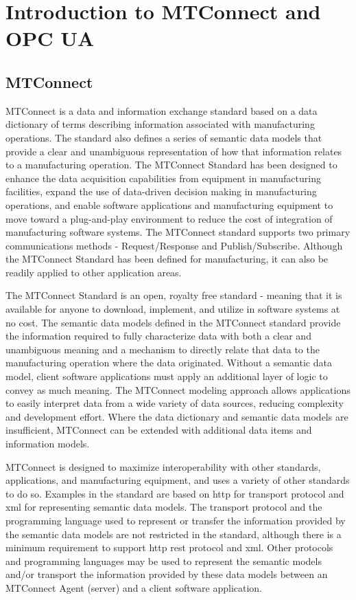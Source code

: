 \section{Introduction to MTConnect and OPC UA}\label{intro}

\subsection{MTConnect}\label{intro-to-mtconnect}
MTConnect is a data and information exchange standard based on a data dictionary of terms describing information associated with manufacturing operations.  The standard also defines a series of semantic data models that provide a clear and unambiguous representation of how that information relates to a manufacturing operation.  The MTConnect Standard has been designed to enhance the data acquisition capabilities from equipment in manufacturing facilities, expand the use of data-driven decision making in manufacturing operations, and enable software applications and manufacturing equipment to move toward a plug-and-play environment to reduce the cost of integration of manufacturing software systems.
The MTConnect standard supports two primary communications methods - Request/Response and Publish/Subscribe.
Although the MTConnect Standard has been defined for manufacturing, it can also be readily applied to other application areas.

The MTConnect Standard is an open, royalty free standard - meaning that it is available for anyone to download, implement, and utilize in software systems at no cost.
The semantic data models defined in the MTConnect standard provide the information required to fully characterize data with both a clear and unambiguous meaning and a mechanism to directly relate that data to the manufacturing operation where the data originated.  Without a semantic data model, client software applications must apply an additional layer of logic to convey as much meaning.  The MTConnect modeling approach allows applications to easily interpret data from a wide variety of data sources, reducing complexity and development effort.
Where the data dictionary and semantic data models are insufficient, MTConnect can be extended with additional data items and information models.

MTConnect is designed to maximize interoperability with other standards, applications, and manufacturing equipment, and uses a variety of other standards to do so. Examples in the standard are based on \gls{http} for transport protocol and \gls{xml} for representing semantic data models. The transport protocol and the programming language used to represent or transfer the information provided by the semantic data models are not restricted in the standard, although there is a minimum requirement to support \gls{http} \gls{rest} protocol and \gls{xml}. Other protocols and programming languages may be used to represent the semantic models and/or transport the information provided by these data models between an MTConnect \gls{Agent} (server) and a client software application.

